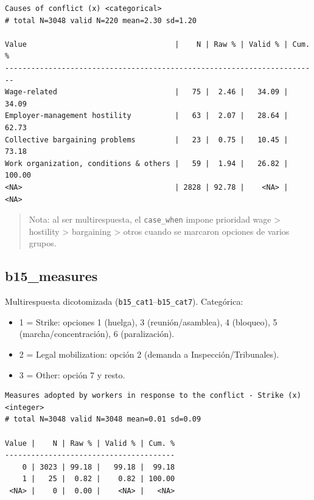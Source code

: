 \documentclass[
  letterpaper,
  DIV=11,
  numbers=noendperiod]{scrreprt}
\newenvironment{Shaded}{\begin{snugshade}}{\end{snugshade}}
\newcommand{\FunctionTok}[1]{\textcolor[rgb]{0.28,0.35,0.67}{#1}}
\newcommand{\NormalTok}[1]{\textcolor[rgb]{0.00,0.23,0.31}{#1}}
\newcommand{\SpecialCharTok}[1]{\textcolor[rgb]{0.37,0.37,0.37}{#1}}
\providecommand{\tightlist}{%
  \setlength{\itemsep}{0pt}\setlength{\parskip}{0pt}}
\begin{document}
\begin{verbatim}
Causes of conflict (x) <categorical> 
# total N=3048 valid N=220 mean=2.30 sd=1.20

Value                                  |    N | Raw % | Valid % | Cum. %
------------------------------------------------------------------------
Wage-related                           |   75 |  2.46 |   34.09 |  34.09
Employer-management hostility          |   63 |  2.07 |   28.64 |  62.73
Collective bargaining problems         |   23 |  0.75 |   10.45 |  73.18
Work organization, conditions & others |   59 |  1.94 |   26.82 | 100.00
<NA>                                   | 2828 | 92.78 |    <NA> |   <NA>
\end{verbatim}

\begin{quote}
Nota: al ser multirespuesta, el \texttt{case\_when} impone prioridad
wage \textgreater{} hostility \textgreater{} bargaining \textgreater{}
otros cuando se marcaron opciones de varios grupos.
\end{quote}

\subsection{b15\_measures}\label{b15_measures}

Multirespuesta dicotomizada (\texttt{b15\_cat1}--\texttt{b15\_cat7}).
Categórica:

\begin{itemize}
\tightlist
\item
  1 = Strike: opciones 1 (huelga), 3 (reunión/asamblea), 4 (bloqueo), 5
  (marcha/concentración), 6 (paralización).
\item
  2 = Legal mobilization: opción 2 (demanda a Inspección/Tribunales).
\item
  3 = Other: opción 7 y resto.
\end{itemize}

\begin{Shaded}
\end{Shaded}

\begin{verbatim}
Measures adopted by workers in response to the conflict - Strike (x) <integer> 
# total N=3048 valid N=3048 mean=0.01 sd=0.09

Value |    N | Raw % | Valid % | Cum. %
---------------------------------------
    0 | 3023 | 99.18 |   99.18 |  99.18
    1 |   25 |  0.82 |    0.82 | 100.00
 <NA> |    0 |  0.00 |    <NA> |   <NA>
\end{verbatim}
\end{document}
